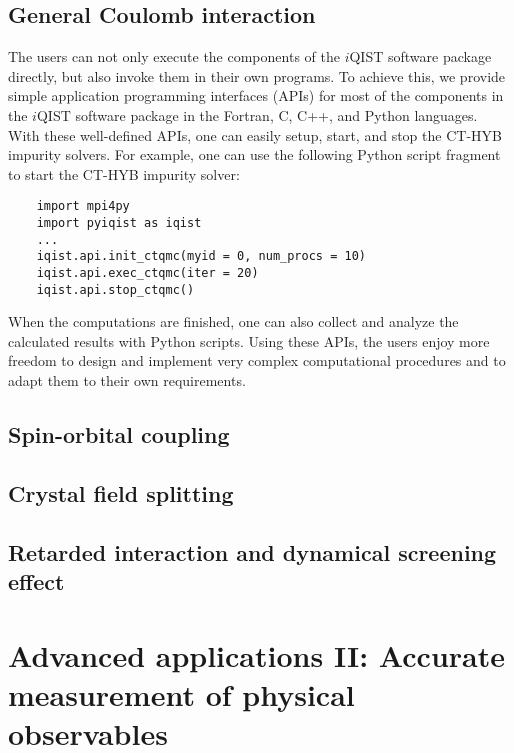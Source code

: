 \subsection{General Coulomb interaction}
The users can not only execute the components of the $i$QIST software package directly, but also invoke them in their own programs. To achieve this, we provide simple application programming interfaces (APIs) for most of the components in the $i$QIST software package in the Fortran, C, C++, and Python languages. With these well-defined APIs, one can easily setup, start, and stop the CT-HYB impurity solvers. For example, one can use the following Python script fragment to start the CT-HYB impurity solver:
\begin{verbatim}
    import mpi4py
    import pyiqist as iqist
    ...
    iqist.api.init_ctqmc(myid = 0, num_procs = 10)
    iqist.api.exec_ctqmc(iter = 20)
    iqist.api.stop_ctqmc()
\end{verbatim}
When the computations are finished, one can also collect and analyze the calculated results with Python scripts. Using these APIs, the users enjoy more freedom to design and implement very complex computational procedures and to adapt them to their own requirements.
\subsection{Spin-orbital coupling}
\subsection{Crystal field splitting}
\subsection{Retarded interaction and dynamical screening effect}

\section{Advanced applications II: Accurate measurement of physical observables}
